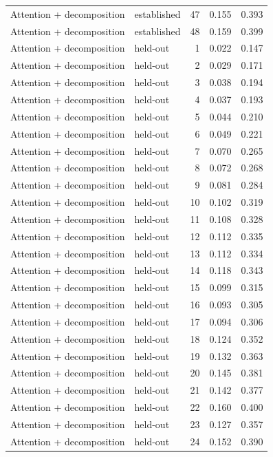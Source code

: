 \begin{tabular}{llrrr}
Attention + decomposition & established & 47 & 0.155 & 0.393 \\
Attention + decomposition & established & 48 & 0.159 & 0.399 \\
Attention + decomposition & held-out & 1 & 0.022 & 0.147 \\
Attention + decomposition & held-out & 2 & 0.029 & 0.171 \\
Attention + decomposition & held-out & 3 & 0.038 & 0.194 \\
Attention + decomposition & held-out & 4 & 0.037 & 0.193 \\
Attention + decomposition & held-out & 5 & 0.044 & 0.210 \\
Attention + decomposition & held-out & 6 & 0.049 & 0.221 \\
Attention + decomposition & held-out & 7 & 0.070 & 0.265 \\
Attention + decomposition & held-out & 8 & 0.072 & 0.268 \\
Attention + decomposition & held-out & 9 & 0.081 & 0.284 \\
Attention + decomposition & held-out & 10 & 0.102 & 0.319 \\
Attention + decomposition & held-out & 11 & 0.108 & 0.328 \\
Attention + decomposition & held-out & 12 & 0.112 & 0.335 \\
Attention + decomposition & held-out & 13 & 0.112 & 0.334 \\
Attention + decomposition & held-out & 14 & 0.118 & 0.343 \\
Attention + decomposition & held-out & 15 & 0.099 & 0.315 \\
Attention + decomposition & held-out & 16 & 0.093 & 0.305 \\
Attention + decomposition & held-out & 17 & 0.094 & 0.306 \\
Attention + decomposition & held-out & 18 & 0.124 & 0.352 \\
Attention + decomposition & held-out & 19 & 0.132 & 0.363 \\
Attention + decomposition & held-out & 20 & 0.145 & 0.381 \\
Attention + decomposition & held-out & 21 & 0.142 & 0.377 \\
Attention + decomposition & held-out & 22 & 0.160 & 0.400 \\
Attention + decomposition & held-out & 23 & 0.127 & 0.357 \\
Attention + decomposition & held-out & 24 & 0.152 & 0.390 \\

\end{tabular}
